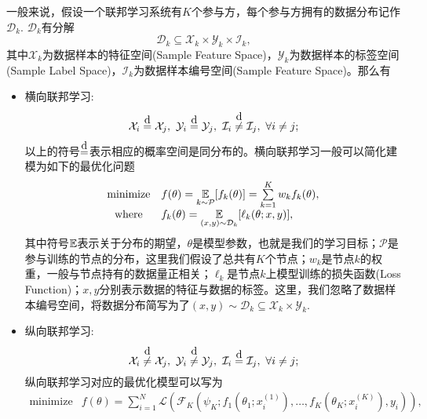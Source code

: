 一般来说，假设一个联邦学习系统有$K$个参与方，每个参与方拥有的数据分布记作$\mathcal{D}_k.$ $\mathcal{D}_k$有分解
\begin{equation*}
\mathcal{D}_k \subseteq \mathcal{X}_k \times \mathcal{Y}_k \times \mathcal{I}_k,
\end{equation*}
其中$\mathcal{X}_k$为数据样本的特征空间(Sample Feature Space)，$\mathcal{Y}_k$为数据样本的标签空间(Sample Label Space)，$\mathcal{I}_k$为数据样本编号空间(Sample Feature Space)。那么有\cite{Yang_2019_VFL,vfl}
\begin{itemize}
\item 横向联邦学习:
\begin{equation*}
\mathcal{X}_i \eqabove{d} \mathcal{X}_j, ~ \mathcal{Y}_i \eqabove{d} \mathcal{Y}_j, ~ \mathcal{I}_i \neqabove{d} \mathcal{I}_j, ~ \forall i \neq j;
\end{equation*}
以上的符号$\eqabove{d}$表示相应的概率空间是同分布的。横向联邦学习一般可以简化建模为如下的最优化问题\cite{kairouz2019advances_fl}
\begin{equation}
\label{eq:general-hfl}
\begin{array}{cl}
\text{minimize} & f(\theta) = \operatorname*{\mathbb{E}}\limits_{k \sim {\mathcal{P}}} [f_k(\theta)] = \sum\limits_{k=1}^K w_k f_k(\theta), \\
\text{where} & f_k(\theta) = \operatorname*{\mathbb{E}}\limits_{(x, y) \sim \mathcal{D}_k} [\ell_k(\theta; x, y)],
\end{array}
\end{equation}
其中符号$\operatorname*{\mathbb{E}}$表示关于分布的期望，$\theta$是模型参数，也就是我们的学习目标；$\mathcal{P}$是参与训练的节点的分布，这里我们假设了总共有$K$个节点；$w_k$是节点$k$的权重，一般与节点持有的数据量正相关；$\ell_k$是节点$k$上模型训练的损失函数(Loss Function)；$x, y$分别表示数据的特征与数据的标签。这里，我们忽略了数据样本编号空间，将数据分布简写为了$(x, y) \sim \mathcal{D}_k \subseteq \mathcal{X}_k \times \mathcal{Y}_k.$
\item 纵向联邦学习:
\begin{equation*}
\mathcal{X}_i \neqabove{d} \mathcal{X}_j, ~ \mathcal{Y}_i \neqabove{d} \mathcal{Y}_j, ~ \mathcal{I}_i \eqabove{d} \mathcal{I}_j, ~ \forall i \neq j;
\end{equation*}
纵向联邦学习对应的最优化模型可以写为\cite{vfl}
\begin{equation}
\label{eq:general-vfl}
\begin{array}{cl}
\text{minimize} & f(\theta) = \sum\limits_{i=1}^N \mathcal{L} \left( \mathcal{F}_K \left( \psi_K; f_{1}(\theta_{1}; x_{i}^{(1)}), \ldots, f_{K}(\theta_{K}; x_{i}^{(K)}), y_{i} \right) \right), \\

\end{array}
\end{equation}
\end{itemize}
